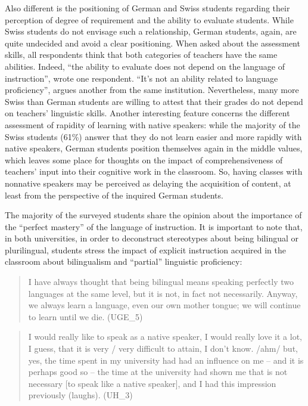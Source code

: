 \documentclass[output=paper]{../langscibook}
\begin{document}
Also different is the positioning of German and Swiss students regarding their perception of degree of requirement and the ability to evaluate students. While Swiss students do not envisage such a relationship, German students, again, are quite undecided and avoid a clear positioning. When asked about the assessment skills, all respondents think that both categories of teachers have the same abilities. Indeed, “the ability to evaluate does not depend on the language of instruction”, wrote one respondent. “It’s not an ability related to language proficiency”, argues another from the same institution. Nevertheless, many more Swiss than German students are willing to attest that their grades do not depend on teachers’ linguistic skills. Another interesting feature concerns the different assessment of rapidity of learning with native speakers: while the majority of the Swiss students (61\%) answer that they do not learn easier and more rapidly with native speakers, German students position themselves again in the middle values, which leaves some place for thoughts on the impact of comprehensiveness of teachers’ input into their cognitive work in the classroom. So, having classes with nonnative speakers may be perceived as delaying the acquisition of content, at least from the perspective of the inquired German students.

The majority of the surveyed students share the opinion about the importance of the “perfect mastery” of the language of instruction. It is important to note that, in both universities, in order to deconstruct stereotypes about being bilingual or plurilingual, students stress the impact of explicit instruction acquired in the classroom about bilingualism and “partial” linguistic proficiency: 

\begin{quote}
I have always thought that being bilingual means speaking perfectly two languages at the same level, but it is not, in fact not necessarily. Anyway, we always learn a language, even our own mother tongue; we will continue to learn until we die. (UGE\_5)
\end{quote}

\begin{quote}
I would really like to speak as a native speaker, I would really love it a lot, I guess, that it is very / very difficult to attain, I don’t know. /ahm/ but, yes, the time spent in my university had had an influence on me – and it is perhaps good so – the time at the university had shown me that is not necessary [to speak like a native speaker], and I had this impression previously (laughs). (UH\_3) 
\end{quote}
\end{document}
